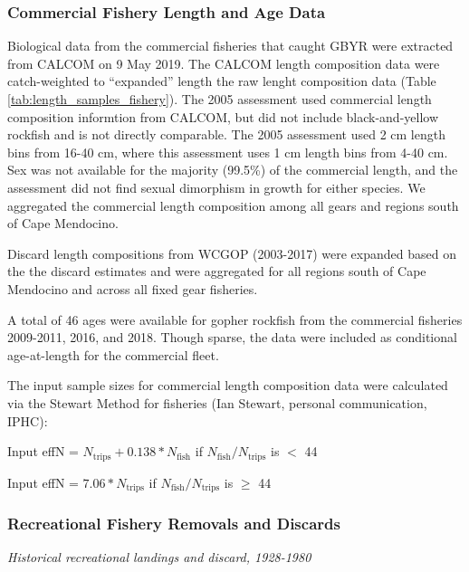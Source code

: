 \documentclass[12pt,]{article}
\begin{document}
\subsubsection{Commercial Fishery Length and Age
Data}\label{commercial-fishery-length-and-age-data}

Biological data from the commercial fisheries that caught GBYR were
extracted from CALCOM on 9 May 2019. The CALCOM length composition data
were catch-weighted to ``expanded'' length the raw lenght composition
data (Table \ref{tab:length_samples_fishery}). The 2005 assessment used
commercial length composition informtion from CALCOM, but did not
include black-and-yellow rockfish and is not directly comparable. The
2005 assessment used 2 cm length bins from 16-40 cm, where this
assessment uses 1 cm length bins from 4-40 cm. Sex was not available for
the majority (99.5\%) of the commercial length, and the assessment did
not find sexual dimorphism in growth for either species. We aggregated
the commercial length composition among all gears and regions south of
Cape Mendocino.

Discard length compositions from WCGOP (2003-2017) were expanded based
on the the discard estimates and were aggregated for all regions south
of Cape Mendocino and across all fixed gear fisheries.

A total of 46 ages were available for gopher rockfish from the
commercial fisheries 2009-2011, 2016, and 2018. Though sparse, the data
were included as conditional age-at-length for the commercial fleet.

The input sample sizes for commercial length composition data were
calculated via the Stewart Method for fisheries (Ian Stewart, personal
communication, IPHC):

\begin{centering}

Input effN = $N_{\text{trips}} + 0.138 * N_{\text{fish}}$ if $N_{\text{fish}}/N_{\text{trips}}$ is $<$ 44

Input effN = $7.06 * N_{\text{trips}}$ if $N_{\text{fish}}/N_{\text{trips}}$ is $\geq$ 44

\end{centering}

\subsubsection{Recreational Fishery Removals and
Discards}\label{recreational-fishery-removals-and-discards}

\emph{Historical recreational landings and discard, 1928-1980}
\end{document}
